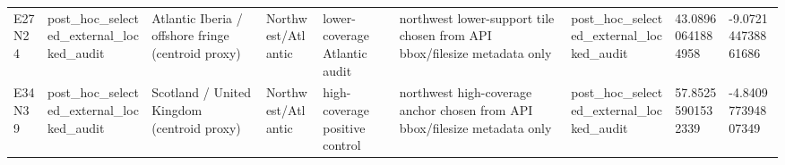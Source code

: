 \begin{landscape}
\begin{longtable}{lllllllll}
E27N24 & post\_hoc\_selected\_external\_locked\_audit & Atlantic Iberia / offshore fringe (centroid proxy) & Northwest/Atlantic & lower-coverage Atlantic audit & northwest lower-support tile chosen from API bbox/filesize metadata only & post\_hoc\_selected\_external\_locked\_audit & 43.08960641884958 & -9.072144738861686 \\
E34N39 & post\_hoc\_selected\_external\_locked\_audit & Scotland / United Kingdom (centroid proxy) & Northwest/Atlantic & high-coverage positive control & northwest high-coverage anchor chosen from API bbox/filesize metadata only & post\_hoc\_selected\_external\_locked\_audit & 57.85255901532339 & -4.840977394807349 \\
\bottomrule
\end{longtable}
\end{landscape}

